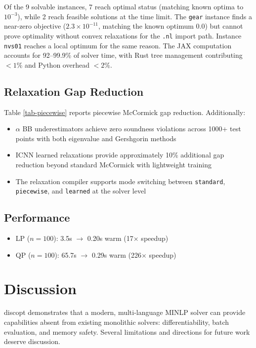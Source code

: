 \documentclass[12pt,preprint]{article}
\begin{document}
Of the 9 solvable instances, 7 reach optimal status (matching known optima to $10^{-3}$), while 2 reach feasible solutions at the time limit. The \texttt{gear} instance finds a near-zero objective ($2.3 \times 10^{-11}$, matching the known optimum $0.0$) but cannot prove optimality without convex relaxations for the \texttt{.nl} import path. Instance \texttt{nvs01} reaches a local optimum for the same reason. The JAX computation accounts for 92--99.9\% of solver time, with Rust tree management contributing $< 1\%$ and Python overhead $< 2\%$.

\subsection{Relaxation Gap Reduction}
\label{org-relaxation-gap-reduction}
Table \ref{tab-piecewise} reports piecewise McCormick gap reduction. Additionally:


\begin{itemize}
\item $\alpha$ BB underestimators achieve zero soundness violations across 1000+ test points with both eigenvalue and Gershgorin methods

\item ICNN learned relaxations provide approximately 10\% additional gap reduction beyond standard McCormick with lightweight training

\item The relaxation compiler supports mode switching between \texttt{standard}, \texttt{piecewise}, and \texttt{learned} at the solver level

\end{itemize}

\subsection{Performance}
\label{org-performance}
\begin{itemize}
\item LP ($n=100$): 3.5s $\to$ 0.20s warm (17$\times$ speedup)

\item QP ($n=100$): 65.7s $\to$ 0.29s warm (226$\times$ speedup)

\end{itemize}


\section{Discussion}
\label{org-discussion}
discopt demonstrates that a modern, multi-language MINLP solver can provide capabilities absent from existing monolithic solvers: differentiability, batch evaluation, and memory safety. Several limitations and directions for future work deserve discussion.
\end{document}
